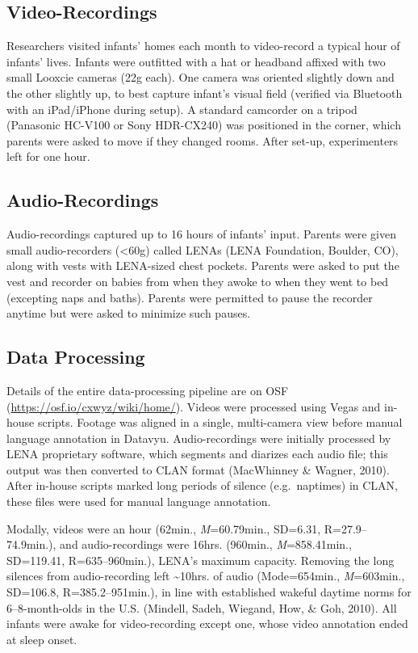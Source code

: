 \documentclass[man]{apa6}
\theoremstyle{definition}
\theoremstyle{definition}
\theoremstyle{definition}
\theoremstyle{remark}
\begin{document}
\subsection{Video-Recordings}\label{video-recordings}

Researchers visited infants' homes each month to video-record a typical
hour of infants' lives. Infants were outfitted with a hat or headband
affixed with two small Looxcie cameras (22g each). One camera was
oriented slightly down and the other slightly up, to best capture
infant's visual field (verified via Bluetooth with an iPad/iPhone during
setup). A standard camcorder on a tripod (Panasonic HC-V100 or Sony
HDR-CX240) was positioned in the corner, which parents were asked to
move if they changed rooms. After set-up, experimenters left for one
hour.

\subsection{Audio-Recordings}\label{audio-recordings}

Audio-recordings captured up to 16 hours of infants' input. Parents were
given small audio-recorders (\textless{}60g) called LENAs (LENA
Foundation, Boulder, CO), along with vests with LENA-sized chest
pockets. Parents were asked to put the vest and recorder on babies from
when they awoke to when they went to bed (excepting naps and baths).
Parents were permitted to pause the recorder anytime but were asked to
minimize such pauses.

\subsection{Data Processing}\label{data-processing}

Details of the entire data-processing pipeline are on OSF
(\url{https://osf.io/cxwyz/wiki/home/}). Videos were processed using
Vegas and in-house scripts. Footage was aligned in a single,
multi-camera view before manual language annotation in Datavyu.
Audio-recordings were initially processed by LENA proprietary software,
which segments and diarizes each audio file; this output was then
converted to CLAN format (MacWhinney \& Wagner, 2010). After in-house
scripts marked long periods of silence (e.g.~naptimes) in CLAN, these
files were used for manual language annotation.

Modally, videos were an hour (62min., \emph{M}=60.79min., SD=6.31,
R=27.9--74.9min.), and audio-recordings were 16hrs. (960min.,
\emph{M}=858.41min., SD=119.41, R=635--960min.), LENA's maximum
capacity. Removing the long silences from audio-recording left
\textasciitilde{}10hrs. of audio (Mode=654min., \emph{M}=603min.,
SD=106.8, R=385.2--951min.), in line with established wakeful daytime
norms for 6--8-month-olds in the U.S. (Mindell, Sadeh, Wiegand, How, \&
Goh, 2010). All infants were awake for video-recording except one, whose
video annotation ended at sleep onset.
\end{document}
